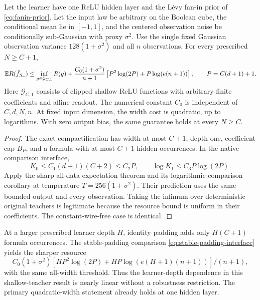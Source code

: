 \begin{corollary}
\label{cor:shallow-quadratic-oracle}
Let the learner have one ReLU hidden layer and the L\'evy fan-in prior of \eqref{eq:fanin-prior}. Let the input law be arbitrary on the Boolean cube, the conditional mean lie in $[-1,1]$, and the centered observation noise be conditionally sub-Gaussian with proxy $\sigma^2$. Use the single fixed Gaussian observation variance $128(1+\sigma^2)$ and all $n$ observations. For every prescribed $N\ge C+1$,
\[
 \mathbb E R(\bar f_{S_n})
 \le\inf_{g\in\mathcal G_{C,1}}R(g)
 +\frac{C_0(1+\sigma^2)}{n+1}
 \left[P^2\log(2P)+P\log(e(n+1))\right],
 \qquad P=C(d+1)+1.
\]
Here $\mathcal G_{C,1}$ consists of clipped shallow ReLU functions with arbitrary finite coefficients and affine readout. The numerical constant $C_0$ is independent of $C,d,N,n$. At fixed input dimension, the width cost is quadratic, up to logarithms. With zero output bias, the same guarantee holds at every $N\ge C$.
\end{corollary}
\begin{proof}
The exact compactification has width at most $C+1$, depth one, coefficient cap $B_P$, and a formula with at most $C+1$ hidden occurrences. In the native comparison interface,
\[
 K_0\le C_1(d+1)(C+2)\le C_2P,
 \qquad \log K_1\le C_3P\log(2P).
\]
Apply the sharp all-data expectation theorem and its logarithmic-comparison corollary at temperature $T=256(1+\sigma^2)$. Their prediction uses the same bounded output and every observation. Taking the infimum over deterministic original teachers is legitimate because the resource bound is uniform in their coefficients. The constant-wire-free case is identical.
\end{proof}

At a larger prescribed learner depth $H$, identity padding adds only $H(C+1)$ formula occurrences. The stable-padding comparison \eqref{eq:stable-padding-interface} yields the sharper resource
\[
 C_0(1+\sigma^2)\left[
 HP^2\log(2P)+HP\log(e(H+1)(n+1))\right]/(n+1),
\]
with the same all-width threshold. Thus the learner-depth dependence in this shallow-teacher result is nearly linear without a robustness restriction. The primary quadratic-width statement already holds at one hidden layer.
